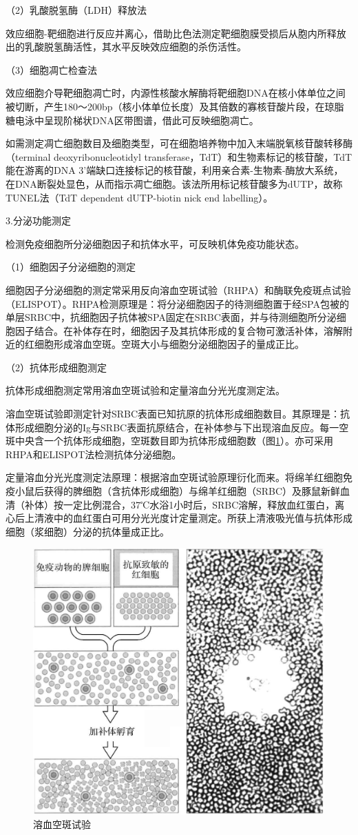 （2）乳酸脱氢酶（LDH）释放法

效应细胞-靶细胞进行反应并离心，借助比色法测定靶细胞膜受损后从胞内所释放出的乳酸脱氢酶活性，其水平反映效应细胞的杀伤活性。

（3）细胞凋亡检查法

效应细胞介导靶细胞凋亡时，内源性核酸水解酶将靶细胞DNA在核小体单位之间被切断，产生180～200bp（核小体单位长度）及其倍数的寡核苷酸片段，在琼脂糖电泳中呈现阶梯状DNA区带图谱，借此可反映细胞凋亡。

如需测定凋亡细胞数目及细胞类型，可在细胞培养物中加入末端脱氧核苷酸转移酶（terminal
deoxyribonucleotidyl
transferase，TdT）和生物素标记的核苷酸，TdT能在游离的DNA
3'端缺口连接标记的核苷酸，利用亲合素-生物素-酶放大系统，在DNA断裂处显色，从而指示凋亡细胞。该法所用标记核苷酸多为dUTP，故称TUNEL法（TdT
dependent dUTP-biotin nick end labelling）。

3.分泌功能测定

检测免疫细胞所分泌细胞因子和抗体水平，可反映机体免疫功能状态。

（1）细胞因子分泌细胞的测定

细胞因子分泌细胞的测定常采用反向溶血空斑试验（RHPA）和酶联免疫斑点试验（ELISPOT）。RHPA检测原理是：将分泌细胞因子的待测细胞置于经SPA包被的单层SRBC中，抗细胞因子抗体被SPA固定在SRBC表面，并与待测细胞所分泌细胞因子结合。在补体存在时，细胞因子及其抗体形成的复合物可激活补体，溶解附近的红细胞形成溶血空斑。空斑大小与细胞分泌细胞因子的量成正比。

（2）抗体形成细胞测定

抗体形成细胞测定常用溶血空斑试验和定量溶血分光光度测定法。

溶血空斑试验即测定针对SRBC表面已知抗原的抗体形成细胞数目。其原理是：抗体形成细胞分泌的Ig与SRBC表面抗原结合，在补体参与下出现溶血反应。每一空斑中央含一个抗体形成细胞，空斑数目即为抗体形成细胞数（图\ref{fig10-27}）。亦可采用RHPA和ELISPOT法检测抗体分泌细胞。

定量溶血分光光度测定法原理：根据溶血空斑试验原理衍化而来。将绵羊红细胞免疫小鼠后获得的脾细胞（含抗体形成细胞）与绵羊红细胞（SRBC）及豚鼠新鲜血清（补体）按一定比例混合，37℃水浴1小时后，SRBC溶解，释放血红蛋白，离心后上清液中的血红蛋白可用分光光度计定量测定。所获上清液吸光值与抗体形成细胞（浆细胞）分泌的抗体量成正比。

\begin{figure}[!htbp]
 \centering
 \includegraphics[width=.6\textwidth]{./images/Image00181.jpg}
 \captionsetup{justification=centering}
 \caption{溶血空斑试验}
 \label{fig10-27}
  \end{figure} 

